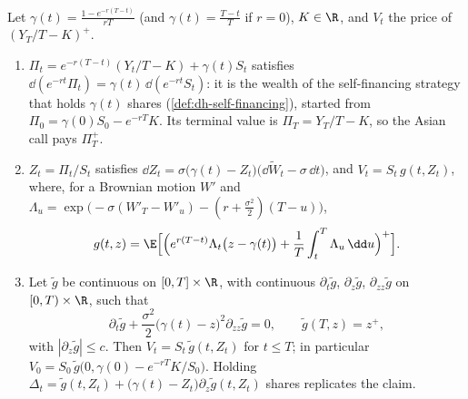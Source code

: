 \begin{theorem}[Ve\v{c}e\v{r}'s equation]\label{thm:exo-vecer}
Let $\gamma(t)=\frac{1-e^{-r(T-t)}}{rT}$ (and $\gamma(t)=\frac{T-t}T$ if $r=0$), $K\in\R$, and
$V_t$ the price of $(Y_T/T-K)^+$.
\begin{enumerate}[label=(\roman*)]
  \item $\Pi_t=e^{-r(T-t)}(Y_t/T-K)+\gamma(t)S_t$ satisfies $\dd(e^{-rt}\Pi_t)=\gamma(t)\,\dd(e^{-rt}S_t)$:
    it is the wealth of the self-financing strategy that holds $\gamma(t)$ shares
    (\cref{def:dh-self-financing}), started from $\Pi_0=\gamma(0)S_0-e^{-rT}K$. Its terminal
    value is $\Pi_T=Y_T/T-K$, so the Asian call pays $\Pi_T^+$.
  \item $Z_t=\Pi_t/S_t$ satisfies $\dd Z_t=\sigma\big(\gamma(t)-Z_t\big)\big(\dd\widetilde W_t-\sigma\,\dd t\big)$,
    and $V_t=S_t\,g(t,Z_t)$, where, for a Brownian motion $W'$ and
    $\Lambda_u=\exp\big(-\sigma(W'_T-W'_u)-(r+\frac{\sigma^2}2)(T-u)\big)$,
    \[
      g(t,z)=\E\Big[\Big(e^{r(T-t)}\Lambda_t\big(z-\gamma(t)\big)+\frac1T\int_t^T\Lambda_u\,\dd u\Big)^+\Big].
    \]
  \item Let $\tilde g$ be continuous on $[0,T]\times\R$, with continuous $\partial_t\tilde g$,
    $\partial_z\tilde g$, $\partial_{zz}\tilde g$ on $[0,T)\times\R$, such that
    \begin{equation}\label{eq:exo-vecer}
      \partial_t\tilde g+\frac{\sigma^2}2\big(\gamma(t)-z\big)^2\partial_{zz}\tilde g=0,\qquad
      \tilde g(T,z)=z^+,
    \end{equation}
    with $|\partial_z\tilde g|\le c$. Then $V_t=S_t\,\tilde g(t,Z_t)$ for $t\le T$; in particular
    $V_0=S_0\,\tilde g\big(0,\gamma(0)-e^{-rT}K/S_0\big)$. Holding
    $\Delta_t=\tilde g(t,Z_t)+\big(\gamma(t)-Z_t\big)\partial_z\tilde g(t,Z_t)$ shares replicates the claim.
\end{enumerate}
\end{theorem}

